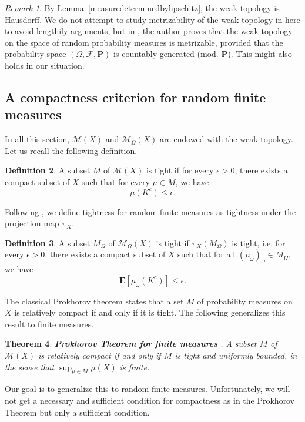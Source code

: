\documentclass{amsart}
\newtheorem{thm}{Theorem}[section]
\theoremstyle{definition}
\newtheorem{defn}[thm]{Definition}
\theoremstyle{remark}
\newtheorem{rem}[thm]{Remark}
\begin{document}
\begin{rem}
By Lemma~\ref{measuredeterminedbylipschitz}, the weak topology is Hausdorff.
We do not attempt to study metrizability of the weak topology in here to avoid lengthily arguments,
but in \cite[Theorem~4.16]{Crauel}, the author proves that the weak topology on the space of random probability measures is metrizable, provided that the probability space $(\Omega,\mathcal{F},\mathbf P)$ is countably generated (mod. $\mathbf P$).
This might also holds in our situation.
\end{rem}

\subsection{A compactness criterion for random finite measures}
In all this section, $\mathcal{M}(X)$ and $\mathcal{M}_\Omega(X)$ are endowed with the weak topology.
Let us recall the following definition.
\begin{defn}\label{deftightnonrandom}
A subset $M$ of $\mathcal{M}(X)$ is tight if for every $\epsilon>0$, there exists a compact subset of $X$ such that for every $\mu\in M$, we have
$$\mu(K^c)\leq \epsilon.$$
\end{defn}

Following \cite{Crauel}, we define tightness for random finite measures as tightness under the projection map $\pi_X$.
\begin{defn}\label{deftightrandom}
A subset $M_\Omega$ of $\mathcal{M}_\Omega(X)$ is tight if $\pi_X(M_\Omega)$ is tight, i.e. for every $\epsilon>0$, there exists a compact subset of $X$ such that for all $(\mu_\omega)_\omega\in M_\Omega$, we have
$$\mathbf E[\mu_\omega(K^c)]\leq \epsilon.$$
\end{defn}

The classical Prokhorov theorem states that a set $M$ of probability measures on $X$ is relatively compact if and only if it is tight.
The following generalizes this result to finite measures.

\begin{thm}\label{classicalProkhorov}\textbf{Prokhorov Theorem for finite measures} \cite[Lemma~4.4]{K17}.
A subset $M$ of $\mathcal{M}(X)$ is relatively compact if and only if $M$ is tight and uniformly bounded, in the sense that $\sup_{\mu\in M} \mu(X)$ is finite.
\end{thm}

Our goal is to generalize this to random finite measures.
Unfortunately, we will not get a necessary and sufficient condition for compactness as in the Prokhorov Theorem but only a sufficient condition.
\end{document}
